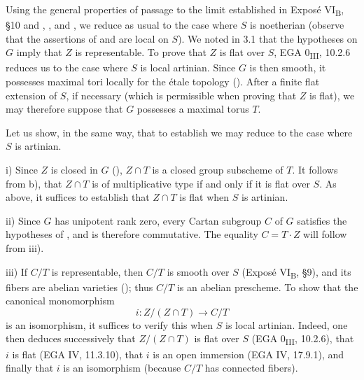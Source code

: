 Using the general properties of passage to the limit established
in Exposé VI\textsubscript{B}, \S10 and , , and
, we reduce as usual to the case where \(S\) is noetherian
(observe that the assertions of  and  are local on \(S\)).
We noted in 3.1 that the hypotheses on \(G\) imply that \(Z\) is
representable. To prove that \(Z\) is flat over \(S\), EGA
0\textsubscript{III}, 10.2.6 reduces us to the case where \(S\) is
local artinian. Since \(G\) is then smooth, it possesses maximal
tori locally for the étale topology (). After a
finite flat extension of \(S\), if necessary (which is permissible
when proving that \(Z\) is flat), we may therefore suppose that
\(G\) possesses a maximal torus \(T\).

Let us show, in the same way, that to establish  we may reduce
to the case where \(S\) is artinian.

\medskip
\noindent i) Since \(Z\) is closed in \(G\) (),
\(Z\cap T\) is a closed group subscheme of \(T\). It follows from
 b), that \(Z\cap T\) is of multiplicative type if and
only if it is flat over \(S\). As above, it suffices to establish
that \(Z\cap T\) is flat when \(S\) is artinian.

\medskip
\noindent ii) Since \(G\) has unipotent rank zero, every Cartan
subgroup \(C\) of \(G\) satisfies the hypotheses of , and
is therefore commutative. The equality \(C=T\cdot Z\) will follow
from iii).

\medskip
\noindent iii) If \(C/T\) is representable, then \(C/T\) is smooth
over \(S\) (Exposé VI\textsubscript{B}, \S9), and its fibers are
abelian varieties (); thus \(C/T\) is an abelian prescheme. To
show that the canonical monomorphism
\[
  i:Z/(Z\cap T)\longrightarrow C/T
\]
is an isomorphism, it suffices to verify this when \(S\) is local
artinian. Indeed, one then deduces successively that
\(Z/(Z\cap T)\) is flat over \(S\) (EGA
0\textsubscript{III}, 10.2.6), that \(i\) is flat
(EGA IV, 11.3.10), that \(i\) is an open immersion
(EGA IV, 17.9.1), and finally that \(i\) is an isomorphism
(because \(C/T\) has connected fibers).

